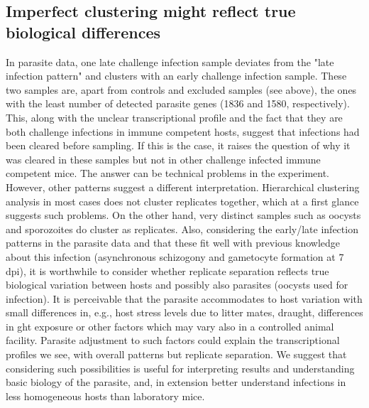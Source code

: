 \documentclass{bmcart}
\begin{document}
\subsection*{Imperfect clustering might reflect true biological differences}
In parasite data, one late challenge infection sample deviates from the "late infection pattern" and clusters with an early challenge infection sample. These two samples are, apart from controls and excluded samples (see above), the ones with the least number of detected parasite genes (1836 and 1580, respectively). This, along with the unclear transcriptional profile and the fact that they are both challenge infections in immune competent hosts, suggest that infections had been cleared before sampling. If this is the case, it raises the question of why it was cleared in these samples but not in other challenge infected immune competent mice. The answer can be technical problems in the experiment. However, other patterns suggest a different interpretation. Hierarchical clustering analysis in most cases does not cluster replicates together, which at a first glance suggests such problems. On the other hand, very distinct samples such as oocysts and sporozoites do cluster as replicates. Also, considering the early/late infection patterns in the parasite data and that these fit well with previous knowledge about this infection (asynchronous schizogony and gametocyte formation at 7 dpi), it is worthwhile to consider whether replicate separation reflects true biological variation between hosts and possibly also parasites (oocysts used for infection). It is perceivable that the parasite accommodates to host variation with small differences in, e.g., host stress levels due to litter mates, draught, differences in ght exposure or other factors which may vary also in a controlled animal facility. Parasite adjustment to such factors could explain the transcriptional profiles we see, with overall patterns but replicate separation. We suggest that considering such possibilities is useful for interpreting results and understanding basic biology of the parasite, and, in extension better understand infections in less homogeneous hosts than laboratory mice. 
\end{document}
